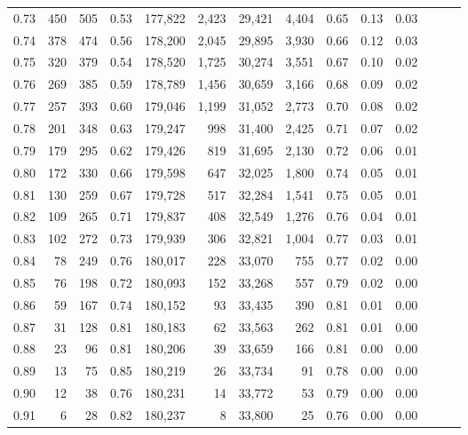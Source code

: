\begin{tabular}{rrrrrrrrrrrrrr}
0.73 &    450 &  505 &  0.53 &  177,822 &    2,423 &  29,421 &   4,404 &  0.65 &  0.13 &      0.03 \\
0.74 &    378 &  474 &  0.56 &  178,200 &    2,045 &  29,895 &   3,930 &  0.66 &  0.12 &      0.03 \\
0.75 &    320 &  379 &  0.54 &  178,520 &    1,725 &  30,274 &   3,551 &  0.67 &  0.10 &      0.02 \\
0.76 &    269 &  385 &  0.59 &  178,789 &    1,456 &  30,659 &   3,166 &  0.68 &  0.09 &      0.02 \\
0.77 &    257 &  393 &  0.60 &  179,046 &    1,199 &  31,052 &   2,773 &  0.70 &  0.08 &      0.02 \\
0.78 &    201 &  348 &  0.63 &  179,247 &      998 &  31,400 &   2,425 &  0.71 &  0.07 &      0.02 \\
0.79 &    179 &  295 &  0.62 &  179,426 &      819 &  31,695 &   2,130 &  0.72 &  0.06 &      0.01 \\
0.80 &    172 &  330 &  0.66 &  179,598 &      647 &  32,025 &   1,800 &  0.74 &  0.05 &      0.01 \\
0.81 &    130 &  259 &  0.67 &  179,728 &      517 &  32,284 &   1,541 &  0.75 &  0.05 &      0.01 \\
0.82 &    109 &  265 &  0.71 &  179,837 &      408 &  32,549 &   1,276 &  0.76 &  0.04 &      0.01 \\
0.83 &    102 &  272 &  0.73 &  179,939 &      306 &  32,821 &   1,004 &  0.77 &  0.03 &      0.01 \\
0.84 &     78 &  249 &  0.76 &  180,017 &      228 &  33,070 &     755 &  0.77 &  0.02 &      0.00 \\
0.85 &     76 &  198 &  0.72 &  180,093 &      152 &  33,268 &     557 &  0.79 &  0.02 &      0.00 \\
0.86 &     59 &  167 &  0.74 &  180,152 &       93 &  33,435 &     390 &  0.81 &  0.01 &      0.00 \\
0.87 &     31 &  128 &  0.81 &  180,183 &       62 &  33,563 &     262 &  0.81 &  0.01 &      0.00 \\
0.88 &     23 &   96 &  0.81 &  180,206 &       39 &  33,659 &     166 &  0.81 &  0.00 &      0.00 \\
0.89 &     13 &   75 &  0.85 &  180,219 &       26 &  33,734 &      91 &  0.78 &  0.00 &      0.00 \\
0.90 &     12 &   38 &  0.76 &  180,231 &       14 &  33,772 &      53 &  0.79 &  0.00 &      0.00 \\
0.91 &      6 &   28 &  0.82 &  180,237 &        8 &  33,800 &      25 &  0.76 &  0.00 &      0.00 \\

\end{tabular}
